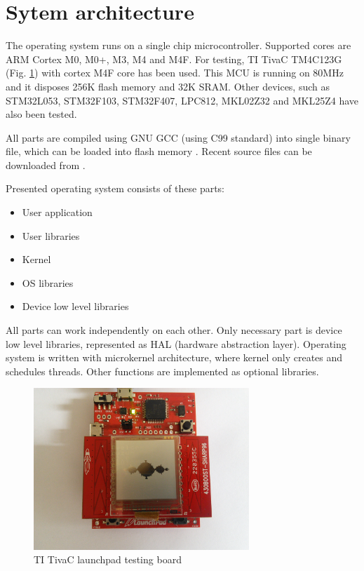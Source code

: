 \documentclass[a4paper, conference]{IEEEtran}
\begin{document}
\section{Sytem architecture}

The operating system runs on a single chip microcontroller. Supported cores are ARM Cortex M0, M0+, M3, M4 and M4F. For testing, TI TivaC TM4C123G \cite{bib:ti_launchpad} (Fig. \ref{fig_ti_launchpad}) with cortex M4F core has been used. This MCU is running on 80MHz and it disposes 256K flash memory and 32K SRAM. Other devices, such as STM32L053, STM32F103, STM32F407, LPC812, MKL02Z32 and MKL25Z4 have also been tested. 

All parts are compiled using GNU GCC (using C99 standard) into single binary file, which can be loaded into flash memory \cite{bib:lm4flash}. Recent source files can be downloaded from \cite{bib:suzuha_git}.

Presented operating system consists of these parts:

\begin{itemize}
	\item User application
	\item User libraries
	\item Kernel
	\item OS libraries
	\item Device low level libraries
\end{itemize}

All parts can work independently on each other. Only necessary part is device low level libraries, represented as HAL 
(hardware abstraction layer). Operating system is written with microkernel architecture, where kernel only creates and schedules threads. Other functions are implemented as optional libraries.

\renewcommand{\figurename}{Fig.}
\begin{figure}[!t]
\centering
\includegraphics[width=3.2in]{testing_board_01.jpg}
\caption{TI TivaC launchpad testing board}
\label{fig_ti_launchpad}
\end{figure}
\end{document}
